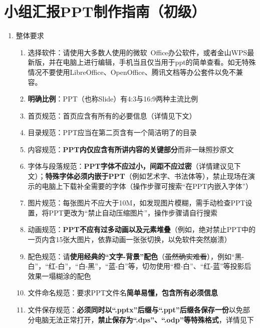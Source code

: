 \section[小组汇报PPT制作指南（初级）]{小组汇报PPT制作指南（初级）}
\begin{enumerate}
      \item 整体要求
            \begin{enumerate}
                  \item 选择软件：请使用大多数人使用的微软\ Office办公软件，或者金山WPS最新版，并在电脑上进行编辑，手机当且仅当用于ppt的简单查看。如无特殊情况不要使用LibreOffice、OpenOffice、腾讯文档等办公套件以免不兼容。
                  \item \textbf{明确比例}：PPT（也称Slide）有4:3与16:9两种主流比例\footnotemark
                  \item 首页规范：首页应含有所有的必要信息（详情见下文）
                  \item 目录规范：PPT应当在第二页含有一个简洁明了的目录
                  \item 内容规范：\textbf{PPT内仅应含有所讲内容的关键部分}而非一昧照抄原文
                  \item 字体与段落规范：\textbf{PPT字体不应过小，间距不应过密}（详情建议见下文）；\textbf{特殊字体必须内嵌于PPT}（例如艺术字、书法体等），禁止现场在演示的电脑上下载补全需要的字体（操作步骤可搜索“在PPT内嵌入字体”）
                  \item 图片规范：每张图片不应大于10M，如发现图片模糊，需手动检查PPT设置，将PPT更改为“禁止自动压缩图片”，操作步骤请自行搜索
                  \item 动画规范：\textbf{PPT不应有过多动画以及元素堆叠}（例如，绝对禁止PPT中的一页内含15张大图片，依靠动画一张张切换，以免软件突然崩溃）
                  \item 配色规范：请\textbf{使用经典的“文字-背景”配色}（\sout{虽然确实难看}），例如“黑-白”，“红-白”，\linebreak[3]“白-黑”，“蓝-白”等，切勿使用“橙-白”、“红-蓝”等投影后效果一塌糊涂的配色\footnotemark
                  \item 文件命名规范：要求PPT文件名\textbf{简单易懂，包含所有必须信息}
                  \item 文件保存规范\footnotemark：\textbf{必须同时以“.pptx”后缀与“.ppt”后缀各保存一份}以免部分电脑无法正常打开，\textbf{禁止保存为“.dps”、“.odp”等特殊格式}，详情见下

\end{enumerate}
\end{enumerate}
